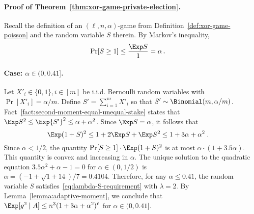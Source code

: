     \paragraph{Proof of Theorem~\ref{thm:xor-game-private-election}.}
        Recall the definition of an $(\ell, n, \alpha)$-game from Definition~\ref{def:xor-game-poisson}
        and 
        the random variable $S$ therein. 
        By Markov's inequality,
        $$
            \Pr[S \geq 1] \leq \frac{\Exp S}{1} = \alpha \,.
        $$

        \paragraph{Case: $\alpha \in (0, 0.41]$.}
        Let $X'_i \in \{0,1\}, i \in [m]$ be i.i.d. Bernoulli random variables 
        with $\Pr[X'_i] = \alpha/m$. 
        Define $S' = \sum_{i=1}^m X'_i$ 
        so that $S'\sim \Binomial(m, \alpha/m)$. 
        Fact~\ref{fact:second-moment-equal-unequal-stake} states that 
        $\Exp S^2 \leq \Exp {S'}^2 \leq \alpha + \alpha^2$. 
        Since $\Exp S = \alpha$, it follows that 
        $$
        \Exp (1 + S)^2 
        \leq 1 + 2 \Exp S + \Exp S^2
        \leq 1 + 3 \alpha + \alpha^2
        \,.
        $$
        Since $\alpha < 1/2$, the quantity 
        $\Pr[S \geq 1] \cdot \Exp (1 + S)^2$ is at most $\alpha\cdot (1 + 3.5 \alpha)$. 
        This quantity is convex and increasing in $\alpha$. 
        The unique solution to the quadratic equation $3.5 \alpha^2 + \alpha - 1 = 0$ 
        for $\alpha \in (0, 1/2)$ 
        is $\alpha = (-1 + \sqrt{1 + 14})/7 = 0.4104$. 
        Therefore, for any $\alpha \leq 0.41$, 
        the random variable $S$ satisfies~\eqref{eq:lambda-S-requirement} 
        with $\lambda = 2$.
        By Lemma~\ref{lemma:adaptive-moment}, we conclude that 
        $\Exp[g^2 \mid A] \leq n^3 (1 + 3 \alpha + \alpha^2)^\ell$ 
        for $\alpha \in (0, 0.41]$.
        
